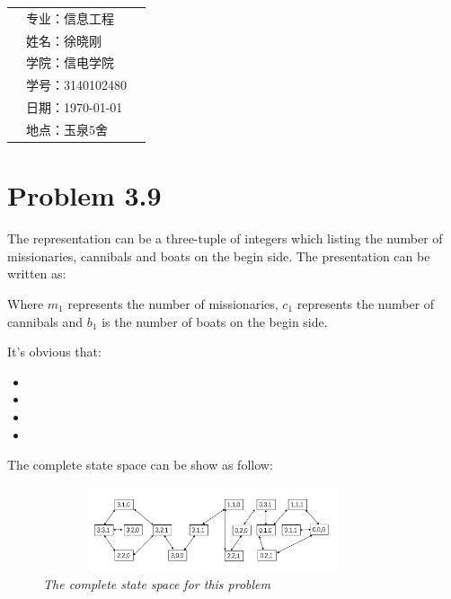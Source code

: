 \documentclass[a4paper,left=2.5cm,right=2.5cm,11pt]{article}
\newcommand{\xiaoerhao}{\fontsize{19.3pt}{\baselineskip}\selectfont}
\newcommand{\wuhao}{\fontsize{10.5pt}{\baselineskip}\selectfont}    %
\begin{document}
	
   \begin{longtable}{p{12cm}p{5cm}p{5cm}}
	\multirow{6}{*}{ \xiaoerhao  \color{red}{Artificial intelligence}} \multirow{6}{*}{ \xiaoerhao Homework2 \space \space \space \space} & 专业：信息工程 \\
	& 姓名：徐晓刚 \\
	& 学院：信电学院 \\
	& 学号：3140102480 \\
	& 日期：\today \\
	& 地点：玉泉5舍 \\
\end{longtable}

\section{Problem 3.9}
The representation can be a three-tuple of integers which listing the number of missionaries, cannibals and boats on the begin side.
The presentation can be written as:

\begin{quote}
\centering{$\bigl[ m_1,c_1,b_1   \bigr]$}
\end{quote}

Where $m_1$ represents the number of missionaries, $c_1$  represents the number of cannibals and $b_1$ is the number of boats on the begin side.

It's obvious that:
\begin{itemize}
\item  \wuhao{initial state: $[3,3,1]$ }
\item  \wuhao{goal state: $[0,0,0]$ }
\item \wuhao{The cost function is 1 for each step}
\item \wuhao{The successors of a state are all the states that 1 or 2 people and 1 boat leave from one side to another}
\end{itemize}

The complete state space can be show as follow:
\begin{figure}[ht]
\centering
\includegraphics[width=10cm, height = 2.5cm]{1.png}  
\caption*{\small\it The complete state space for this problem}
\end{figure}
\end{document}
